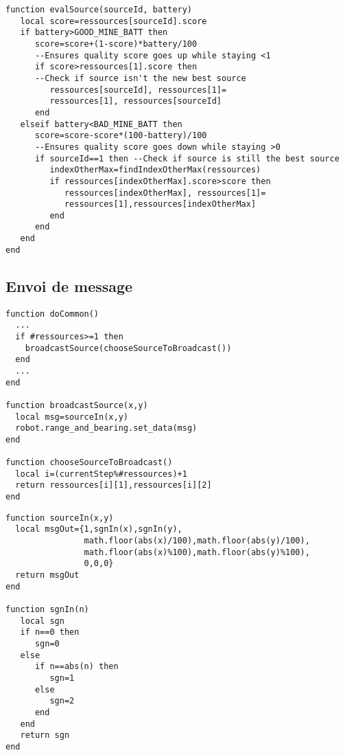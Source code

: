 \begin{subappendices}
\begin{lstlisting}[caption=Evaluation de la qualité de la source]
function evalSource(sourceId, battery)
   local score=ressources[sourceId].score
   if battery>GOOD_MINE_BATT then
      score=score+(1-score)*battery/100
      --Ensures quality score goes up while staying <1
      if score>ressources[1].score then
      --Check if source isn't the new best source
         ressources[sourceId], ressources[1]=
         ressources[1], ressources[sourceId]
      end
   elseif battery<BAD_MINE_BATT then
      score=score-score*(100-battery)/100
      --Ensures quality score goes down while staying >0
      if sourceId==1 then --Check if source is still the best source
         indexOtherMax=findIndexOtherMax(ressources)
         if ressources[indexOtherMax].score>score then
            ressources[indexOtherMax], ressources[1]=
            ressources[1],ressources[indexOtherMax]
         end
      end
   end
end
\end{lstlisting}


\subsection{Envoi de message}

\begin{lstlisting}[caption=Envoi d'un message différent à chaque pas]
function doCommon()
  ...
  if #ressources>=1 then
    broadcastSource(chooseSourceToBroadcast())
  end
  ...
end

function broadcastSource(x,y)
  local msg=sourceIn(x,y)
  robot.range_and_bearing.set_data(msg)
end

function chooseSourceToBroadcast()
  local i=(currentStep%#ressources)+1
  return ressources[i][1],ressources[i][2]
end
\end{lstlisting}

\begin{lstlisting}[caption=Encodage du message]
function sourceIn(x,y)
  local msgOut={1,sgnIn(x),sgnIn(y),
                math.floor(abs(x)/100),math.floor(abs(y)/100),
                math.floor(abs(x)%100),math.floor(abs(y)%100),
                0,0,0}
  return msgOut
end

function sgnIn(n)
   local sgn
   if n==0 then
      sgn=0
   else
      if n==abs(n) then
         sgn=1
      else
         sgn=2
      end
   end
   return sgn
end
\end{lstlisting}



\end{subappendices}
